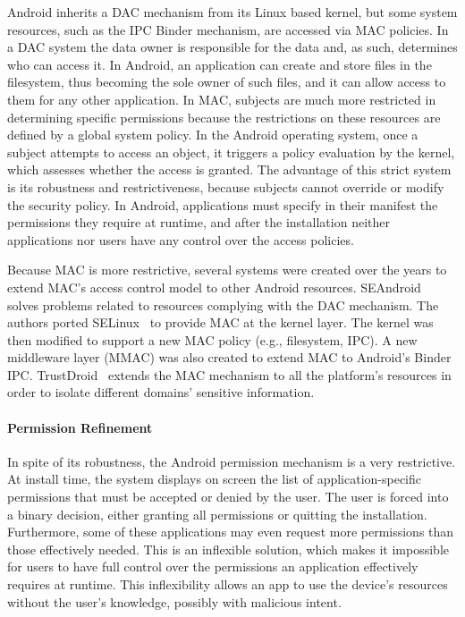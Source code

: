 Android inherits a \ac{DAC} mechanism from its Linux based kernel, but some system resources, such as the IPC Binder mechanism, are accessed via \ac{MAC} policies. In a \ac{DAC} system the data owner is responsible for the data and, as such, determines who can access it. In Android, an application can create and store files in the filesystem, thus becoming the sole owner of such files, and it can allow access to them for any other application. In \ac{MAC}, subjects are much more restricted in determining specific permissions because the restrictions on these resources are defined by a global system policy. In the Android operating system, once a subject attempts to access an object, it triggers a policy evaluation by the kernel, which assesses whether the access is granted. The advantage of this strict system is its robustness and restrictiveness, because subjects cannot override or modify the security policy. In Android, applications must specify in their manifest the permissions they require at runtime, and after the installation neither applications nor users have any control over the access policies.

Because \ac{MAC} is more restrictive, several systems were created over the years to extend \ac{MAC}'s access control model to other Android resources. SEAndroid~\cite{smalley2013security} solves problems related to resources complying with the \ac{DAC} mechanism. The authors ported SELinux~\cite{peter2001integrating} to provide \ac{MAC} at the kernel layer. The kernel was then modified to support a new \ac{MAC} policy (e.g., filesystem, IPC). A new middleware layer (MMAC) was also created to extend \ac{MAC} to Android's Binder IPC. TrustDroid~\cite{bugiel2011practical} extends the \ac{MAC} mechanism to all the platform's resources in order to isolate different domains' sensitive information.

\paragraph{\textbf{Permission Refinement}}

In spite of its robustness, the Android permission mechanism is a very restrictive. At install time, the system displays on screen the list of application-specific permissions that must be accepted or denied by the user. The user is forced into a binary decision, either granting all permissions or quitting the installation. Furthermore, some of these applications may even request more permissions than those effectively needed. This is an inflexible solution, which makes it impossible for users to have full control over the permissions an application effectively requires at runtime. This inflexibility allows an app to use the device's resources without the user's knowledge, possibly with malicious intent.

